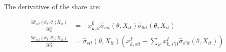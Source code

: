 \documentclass[11.5pt]{article}
\begin{document}
The derivatives of the share are:


\begin{align*}
    \frac{\partial \hat\sigma_{sit}(\theta_I, \theta_0; X_{it})}{\partial \theta_0^k} &  = - x^0_{k,it} \hat \sigma_{sit}(\theta,X_{it}) \hat \sigma_{0it}(\theta,X_{it}) \\
    \frac{\partial \hat\sigma_{sit}(\theta_I, \theta_0; X_{it})}{\partial \theta_I^k} & = \hat \sigma_{sit}(\theta, X_{it})  \left(x_{k,sit}^I - \sum_{s'} x_{k,s'it}^I \hat \sigma_{s'it}(\theta, X_{it})\right)
\end{align*}



\end{document}
